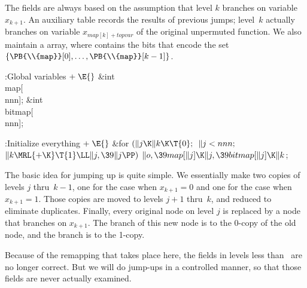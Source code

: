 The  fields are always based on the assumption that level $k$
branches
on variable $x_{k+1}$. An auxiliary  table records the results of
previous jumps; level~$k$ actually branches on variable
$x_{map[k]+topvar}$ of the original unpermuted function. We also maintain
a  array, where  contains the bits that
encode the set
$\{\PB{\\{map}}[0],\ldots,\PB{\\{map}}[k-1]\}$.

\Y\B\4:Global variables\X${}\mathrel+\E{}$\6
\&{int} \\{map}[\\{nnn}];\6
\&{int} \\{bitmap}[\\{nnn}];\par
\fi

\B{}:Initialize everything\X${}\mathrel+\E{}$\6
\&{for} ${}(\|j\K\|k\K\T{0};{}$ ${}\|j<\\{nnn};{}$ ${}\|k\MRL{+{\K}}\T{1}\LL%
\|j,\39\|j\PP){}$\1\5
${}\|o,\39\\{map}[\|j]\K\|j,\39\\{bitmap}[\|j]\K\|k{}$;\2\par
\fi

The basic idea for jumping up is quite simple. We essentially make
two copies of levels $j$ thru~$k-1$, one for the case when $x_{k+1}=0$
and one for the case when $x_{k+1}=1$. Those copies are moved to
levels $j+1$ thru~$k$, and reduced to eliminate duplicates.
Finally, every original node on level $j$ is replaced by a node
that branches on $x_{k+1}$. The  branch of this new node is
to the 0-copy of the old node, and the  branch is to the 1-copy.

Because of the remapping that takes place here, the  fields
in levels less than~ are no longer correct. But we will do
jump-ups in a controlled manner, so that those  fields are
never actually examined.

